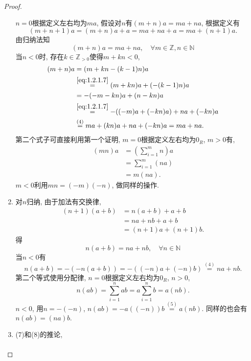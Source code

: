\documentclass{../solutions-cn}
\begin{document}
\begin{proof}
\begin{enumerate}[(1)]
        $n = 0$根据定义左右均为$ma$, 假设对$n$有$(m + n)a = ma + na$, 根据定义有
        \[
            (m + n + 1)a = (m + n)a + a = ma + na + a = ma + (n + 1)a.
        \]
        由归纳法知
        \begin{equation}
            (m + n)a = ma + na, \quad \forall m \in \mathbb{Z}, n \in \mathbb{N}
            \tag{i}
            \label{eq:1.2.1.7}
        \end{equation}
        当$n < 0$时, 存在$k \in \mathbb{Z}_{>0}$使得$m + kn < 0$,
        \[
        \begin{aligned}
            (m + n)a &= (m + kn - (k - 1)n)a\\
            &\overset{\eqref{eq:1.2.1.7}}= (m + kn)a + (-(k - 1)n)a\\
            &= -(-m - kn)a + (n - kn)a\\
            &\overset{\eqref{eq:1.2.1.7}}= -((-m)a + (-kn)a) + na + (-kn)a\\
            &\overset{(4)}= ma + (kn)a + na + (-kn)a = ma + na.
        \end{aligned}
        \]
        第二个式子可直接利用第一个证明, $m = 0$根据定义左右均为$0_R$, $m > 0$有,
        \[
        \begin{aligned}
            (mn)a &= \left(\sum_{i = 1}^{m} n\right)a\\
            &= \sum_{i = 1}^{m} (na)\\
            &= m(na).
        \end{aligned}
        \]
        $m < 0$利用$mn = (-m)(-n)$, 做同样的操作.
        \item 对$n$归纳, 由于加法有交换律,
        \[
        \begin{aligned}
            (n + 1)(a + b) &= n(a + b) + a + b\\
            &= na + nb + a + b\\
            &= (n + 1)a + (n + 1)b.
        \end{aligned}
        \]
        得
        \[
            n(a + b) = na + nb, \quad \forall n \in \mathbb{N}
        \]
        当$n < 0$有
        \[
            n(a + b) = -(-n(a + b)) = -((-n)a + (-n)b) \overset{(4)}= na + nb.
        \]
        第二个等式使用分配律, $n = 0$根据定义左右均为$0_R$, $n > 0$,
        \[
            n(ab) = \sum_{i = 1}^{n} ab = a\sum_{i = 1}^{n} b = a(nb).
        \]
        $n < 0$, 用$n = -(-n)$, $n(ab) = -a((-n))b \overset{(5)}= a(nb)$. 同样的也会有$n(ab) = (na)b$.
        \item (7)和(8)的推论,
        \[
        \begin{aligned}

\end{aligned}\]
\end{enumerate}
\end{proof}
\end{document}

